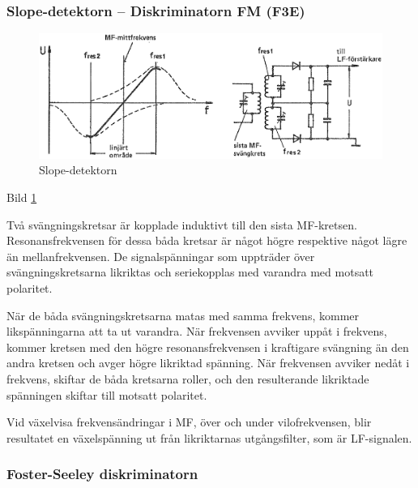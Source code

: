 \subsubsection{Slope-detektorn -- Diskriminatorn FM (F3E)}

\begin{figure}
\includegraphics[width=\textwidth]{images/cropped_pdfs/bild_2_3-59.pdf}
\caption{Slope-detektorn}
\label{fig:BildII3-59}
\end{figure}

Bild \ref{fig:BildII3-59}

Två svängningskretsar är kopplade induktivt till den sista
MF-kretsen. Resonansfrekvensen för dessa båda kretsar är något högre
respektive något lägre än mellanfrekvensen. De signalspänningar som
uppträder över svängningskretsarna likriktas och seriekopplas med
varandra med motsatt polaritet.

När de båda svängningskretsarna matas med samma frekvens, kommer
likspänningarna att ta ut varandra. När frekvensen avviker uppåt i
frekvens, kommer kretsen med den högre resonansfrekvensen i kraftigare
svängning än den andra kretsen och avger högre likriktad spänning. När
frekvensen avviker nedåt i frekvens, skiftar de båda kretsarna roller,
och den resulterande likriktade spänningen skiftar till motsatt
polaritet.

Vid växelvisa frekvensändringar i MF, över och under vilofrekvensen,
blir resultatet en växelspänning ut från likriktarnas utgångsfilter,
som är LF-signalen.

\subsubsection{Foster-Seeley diskriminatorn}

